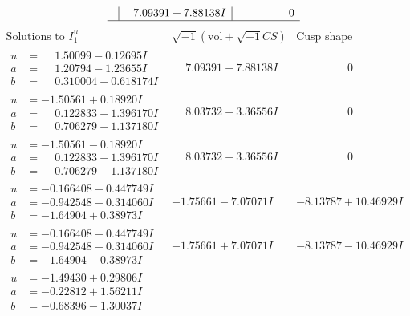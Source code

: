 \documentclass[1p]{elsarticle_modified}
\theoremstyle{definition}
\newcommand{\I}{\sqrt{-1}}
\begin{document}
$$\begin{array}{c|c|c}
 & \phantom{-}7.09391 + 7.88138 I & \phantom{-0.000000 } 0\\
 \hline 
 \end{array}$$\newpage$$\begin{array}{c|c|c}  
\text{Solutions to }I^u_{1}& \I (\text{vol} + \sqrt{-1}CS) & \text{Cusp shape}\\
 \hline 
\begin{aligned}
u &= \phantom{-}1.50099 - 0.12695 I \\
a &= \phantom{-}1.20794 - 1.23655 I \\
b &= \phantom{-}0.310004 + 0.618174 I\end{aligned}
 & \phantom{-}7.09391 - 7.88138 I & \phantom{-0.000000 } 0 \\ \hline\begin{aligned}
u &= -1.50561 + 0.18920 I \\
a &= \phantom{-}0.122833 - 1.396170 I \\
b &= \phantom{-}0.706279 + 1.137180 I\end{aligned}
 & \phantom{-}8.03732 - 3.36556 I & \phantom{-0.000000 } 0 \\ \hline\begin{aligned}
u &= -1.50561 - 0.18920 I \\
a &= \phantom{-}0.122833 + 1.396170 I \\
b &= \phantom{-}0.706279 - 1.137180 I\end{aligned}
 & \phantom{-}8.03732 + 3.36556 I & \phantom{-0.000000 } 0 \\ \hline\begin{aligned}
u &= -0.166408 + 0.447749 I \\
a &= -0.942548 - 0.314060 I \\
b &= -1.64904 + 0.38973 I\end{aligned}
 & -1.75661 - 7.07071 I & -8.13787 + 10.46929 I \\ \hline\begin{aligned}
u &= -0.166408 - 0.447749 I \\
a &= -0.942548 + 0.314060 I \\
b &= -1.64904 - 0.38973 I\end{aligned}
 & -1.75661 + 7.07071 I & -8.13787 - 10.46929 I \\ \hline\begin{aligned}
u &= -1.49430 + 0.29806 I \\
a &= -0.22812 + 1.56211 I \\
b &= -0.68396 - 1.30037 I\end{aligned}

\end{array}$$
\end{document}
